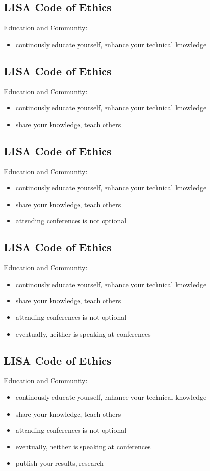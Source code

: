 \documentclass[xga]{xdvislides}
\begin{document}
\subsection{LISA Code of Ethics}
Education and Community:
\begin{itemize}
	\item continously educate yourself, enhance your technical knowledge
\end{itemize}

\subsection{LISA Code of Ethics}
Education and Community:
\begin{itemize}
	\item continously educate yourself, enhance your technical knowledge
	\item share your knowledge, teach others
\end{itemize}

\subsection{LISA Code of Ethics}
Education and Community:
\begin{itemize}
	\item continously educate yourself, enhance your technical knowledge
	\item share your knowledge, teach others
	\item attending conferences is not optional
\end{itemize}

\subsection{LISA Code of Ethics}
Education and Community:
\begin{itemize}
	\item continously educate yourself, enhance your technical knowledge
	\item share your knowledge, teach others
	\item attending conferences is not optional
	\item eventually, neither is speaking at conferences
\end{itemize}

\subsection{LISA Code of Ethics}
Education and Community:
\begin{itemize}
	\item continously educate yourself, enhance your technical knowledge
	\item share your knowledge, teach others
	\item attending conferences is not optional
	\item eventually, neither is speaking at conferences
	\item publish your results, research
\end{itemize}
\end{document}
